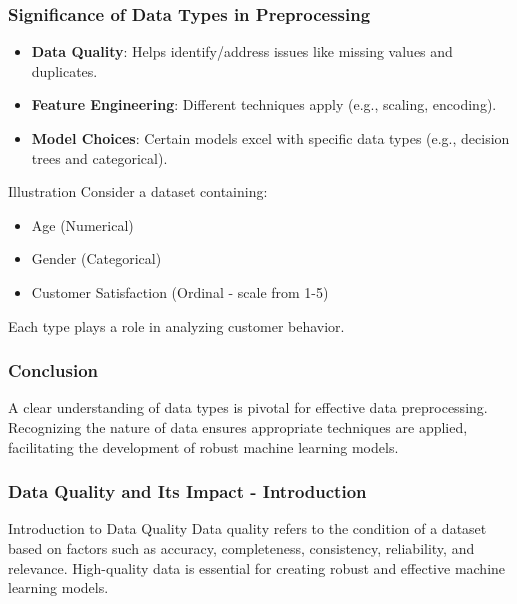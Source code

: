 \documentclass[aspectratio=169]{beamer}
\begin{document}
\begin{frame}[fragile]
    \frametitle{Significance of Data Types in Preprocessing}
    \begin{itemize}
        \item \textbf{Data Quality}: Helps identify/address issues like missing values and duplicates.
        \item \textbf{Feature Engineering}: Different techniques apply (e.g., scaling, encoding).
        \item \textbf{Model Choices}: Certain models excel with specific data types (e.g., decision trees and categorical).
    \end{itemize}
    \begin{block}{Illustration}
        Consider a dataset containing:
        \begin{itemize}
            \item Age (Numerical)
            \item Gender (Categorical)
            \item Customer Satisfaction (Ordinal - scale from 1-5)
        \end{itemize}
        Each type plays a role in analyzing customer behavior.
    \end{block}
\end{frame}

\begin{frame}[fragile]
    \frametitle{Conclusion}
    A clear understanding of data types is pivotal for effective data preprocessing. Recognizing the nature of data ensures appropriate techniques are applied, facilitating the development of robust machine learning models.
\end{frame}

\begin{frame}[fragile]
    \frametitle{Data Quality and Its Impact - Introduction}
    \begin{block}{Introduction to Data Quality}
        Data quality refers to the condition of a dataset based on factors such as accuracy, completeness, consistency, reliability, and relevance. 
        High-quality data is essential for creating robust and effective machine learning models.
    \end{block}
\end{frame}
\end{document}
